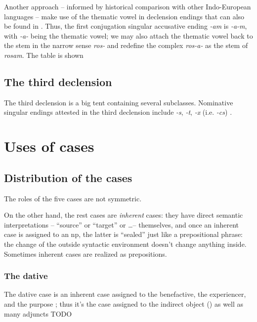 \documentclass[a4paper, oneside, 12pt]{report}
\newcommand*{\citesec}[1]{\S~{#1}}
\newcommand*{\citepage}[1]{p.~{#1}}
\newcommand*{\citepages}[1]{pp.~{#1}}
\newcommand{\form}[1]{\emph{#1}}
\begin{document}
Another approach -- informed by historical comparison with other Indo-European languages -- 
make use of the thematic vowel 
in declension endings that can also be found in
\citep[\citepages{45, 63}]{oniga2014latin}.
Thus, the first conjugation singular accusative ending \form{-am} 
is \form{-a-m}, 
with \form{-a-} being the thematic vowel;
we may also attach the thematic vowel back to the stem in the narrow sense \form{ros-} 
and redefine the complex \form{ros-a-} as the stem of \form{rosam}.
The table is shown 

\subsection{The third declension}\label{sec:np.inflection.3}

The third declension is a big tent containing several subclasses.
Nominative singular endings attested in the third declension
include \form{-s}, \form{-t}, \form{-x} (i.e. \form{-cs}) \citep[\citesec{53}]{allen1903allen}.

\section{Uses of cases}

\subsection{Distribution of the cases}\label{sec:np.case-distribution}

The roles of the five cases are not symmetric.


On the other hand, the rest cases are \emph{inherent} cases:
they have direct semantic interpretations
-- ``source'' or ``target'' or \dots -- themselves,
and once an inherent case is assigned to an \acs{np},
the latter is ``sealed'' just like a prepositional phrase:
the change of the outside syntactic environment 
doesn't change anything inside.
Sometimes inherent cases are realized as prepositions.

\subsubsection{The dative}\label{sec:dative-distribution}

The dative case is an inherent case assigned to the benefactive, the experiencer, and the purpose
\citep[\citepage{251}]{oniga2014latin};
thus it's the case assigned to the indirect object ()
as well as many adjuncts TODO
\end{document}
